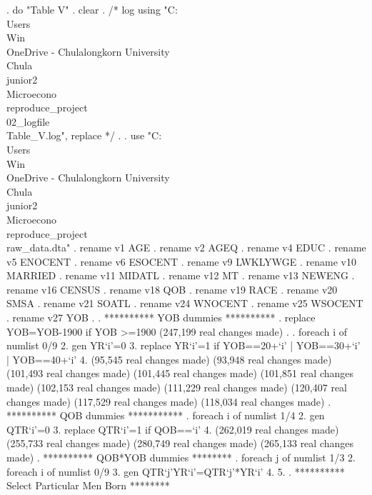 . do "Table V"
{\smallskip}
. clear
{\smallskip}
. /* log using "C:\\Users\\Win\\OneDrive - Chulalongkorn University\\Chula\\junior2\\Microecono\\reproduce_project\\02_logfile\\Table_V.log", replace  */
. 
. use "C:\\Users\\Win\\OneDrive - Chulalongkorn University\\Chula\\junior2\\Microecono\\reproduce_project\\raw_data.dta"
{\smallskip}
. rename v1 AGE
{\smallskip}
. rename v2 AGEQ
{\smallskip}
. rename v4 EDUC
{\smallskip}
. rename v5 ENOCENT
{\smallskip}
. rename v6 ESOCENT
{\smallskip}
. rename v9 LWKLYWGE
{\smallskip}
. rename v10 MARRIED
{\smallskip}
. rename v11 MIDATL
{\smallskip}
. rename v12 MT
{\smallskip}
. rename v13 NEWENG
{\smallskip}
. rename v16 CENSUS
{\smallskip}
. rename v18 QOB
{\smallskip}
. rename v19 RACE
{\smallskip}
. rename v20 SMSA
{\smallskip}
. rename v21 SOATL
{\smallskip}
. rename v24 WNOCENT
{\smallskip}
. rename v25 WSOCENT
{\smallskip}
. rename v27 YOB
{\smallskip}
. 
. **********  YOB dummies **********
. replace YOB=YOB-1900 if YOB >=1900
(247,199 real changes made)
{\smallskip}
. 
. foreach i of numlist 0/9 {\lbr}
  2. gen YR`i'=0
  3. replace YR`i'=1 if YOB==20+`i' | YOB==30+`i' | YOB==40+`i' 
  4. {\rbr}
(95,545 real changes made)
(93,948 real changes made)
(101,493 real changes made)
(101,445 real changes made)
(101,851 real changes made)
(102,153 real changes made)
(111,229 real changes made)
(120,407 real changes made)
(117,529 real changes made)
(118,034 real changes made)
{\smallskip}
. **********  QOB dummies ***********
. foreach i of numlist 1/4 {\lbr}
  2. gen QTR`i'=0
  3. replace QTR`i'=1 if QOB==`i'
  4. {\rbr}
(262,019 real changes made)
(255,733 real changes made)
(280,749 real changes made)
(265,133 real changes made)
{\smallskip}
. **********  QOB*YOB dummies ********
. foreach j of numlist 1/3 {\lbr}
  2. foreach i of numlist 0/9 {\lbr}
  3. gen QTR`j'YR`i'=QTR`j'*YR`i'
  4. {\rbr}
  5. {\rbr}
{\smallskip}
. **********  Select Particular Men Born ********
